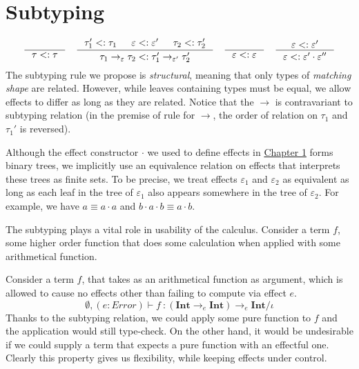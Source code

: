 \documentclass[declaration,shortabstract]{iithesis}
\theoremstyle{definition} \newtheorem{definition}{Definition}[section]
\newcommand{\types}[4][\Gamma;\Theta]{\ensuremath{{{#1} \vdash {#2} \: : {#3}/{#4}}}}
\newcommand{\arrow}[3]{{#1}\rightarrow_{#2}{#3}}
\begin{document}
\section{Subtyping}
\begin{gather*}
\begin{gathered}
\inference{}{\tau <: \tau}
\quad
\inference{
    \tau_1' <: \tau_1 & \varepsilon <: \varepsilon' & \tau_2 <: \tau_2'
}{
    \arrow{\tau_1}{\varepsilon}{\tau_2} <: \arrow{\tau_1'}{\varepsilon'}{\tau_2'}
} 
\quad
\inference{}{\varepsilon <: \varepsilon}
\quad
\inference{
    \varepsilon <: \varepsilon'
}{
    \varepsilon <: \varepsilon' \cdot \varepsilon''
}
\end{gathered}
\end{gather*}
\setlength{\jot}{3pt}
The subtyping rule we propose is \textit{structural}, meaning that only types of
\textit{matching shape} are related.
However, while leaves containing types must be equal, we allow effects to differ as long as they are related.
Notice that the $\rightarrow$ is contravariant to subtyping relation
(in the premise of rule for $\rightarrow$, the order of relation on $\tau_1$ and $\tau_1'$ is reversed).

Although the effect constructor $\cdot$ we used to define effects in 
\hyperlink{chapter.1}{Chapter 1} forms binary trees,
we implicitly use an equivalence relation on effects that interprets
these trees as finite sets.
To be precise, we treat effects $\varepsilon_1$ and $\varepsilon_2$ as equivalent
as long as each leaf in the tree of $\varepsilon_1$ 
also appears somewhere in the tree of $\varepsilon_2$.
For example, we have $a \equiv a\cdot a$ and $b \cdot a \cdot b \equiv a \cdot b$.

The subtyping plays a vital role in usability of the calculus.
Consider a term $f$, some higher order function that does some calculation
when applied with some arithmetical function.

Consider a term $f$, that takes as an arithmetical function as argument,
which is allowed to cause no effects other than failing to compute via effect $e$.
$$
\types[\emptyset, (e: Error)]
    {f}
    {\arrow{(\arrow{\textbf{Int}}{e}{\textbf{Int}})}{e}{\textbf{Int}}}
    {\iota}
$$
Thanks to the subtyping relation, we could apply some pure function to $f$
and the application would still type-check.
On the other hand, it would be undesirable if we could supply a term that expects
a pure function with an effectful one.
Clearly this property gives us flexibility, while keeping effects under control.
\end{document}

